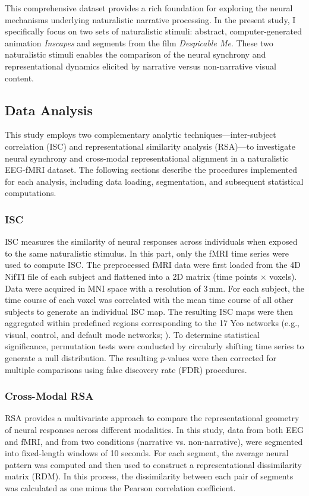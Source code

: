 \documentclass[stu,12pt,floatsintext]{apa7}
\begin{document}
This comprehensive dataset provides a rich foundation for exploring the neural mechanisms underlying naturalistic narrative processing. In the present study, I specifically focus on two sets of naturalistic stimuli: abstract, computer-generated animation \textit{Inscapes} and segments from the film \textit{Despicable Me}. These two naturalistic stimuli enables the comparison of the neural synchrony and representational dynamics elicited by narrative versus non-narrative visual content.

\subsection{Data Analysis}
This study employs two complementary analytic techniques—inter-subject correlation (ISC) and representational similarity analysis (RSA)—to investigate neural synchrony and cross-modal representational alignment in a naturalistic EEG-fMRI dataset. The following sections describe the procedures implemented for each analysis, including data loading, segmentation, and subsequent statistical computations.

\subsubsection{ISC}
ISC measures the similarity of neural responses across individuals when exposed to the same naturalistic stimulus. In this part, only the fMRI time series were used to compute ISC. The preprocessed fMRI data were first loaded from the 4D NifTI file of each subject and flattened into a 2D matrix (time points $\times$ voxels). Data were acquired in MNI space with a resolution of 3\,mm. For each subject, the time course of each voxel was correlated with the mean time course of all other subjects to generate an individual ISC map. The resulting ISC maps were then aggregated within predefined regions corresponding to the 17 Yeo networks (e.g., visual, control, and default mode networks; \cite{thomas_yeo_organization_2011}). To determine statistical significance, permutation tests were conducted by circularly shifting time series to generate a null distribution. The resulting $p$-values were then corrected for multiple comparisons using false discovery rate (FDR) procedures.

\subsubsection{Cross-Modal RSA}
RSA provides a multivariate approach to compare the representational geometry of neural responses across different modalities. In this study, data from both EEG and fMRI, and from two conditions (narrative vs. non-narrative), were segmented into fixed-length windows of 10 seconds. For each segment, the average neural pattern was computed and then used to construct a representational dissimilarity matrix (RDM). In this process, the dissimilarity between each pair of segments was calculated as one minus the Pearson correlation coefficient.
\end{document}
